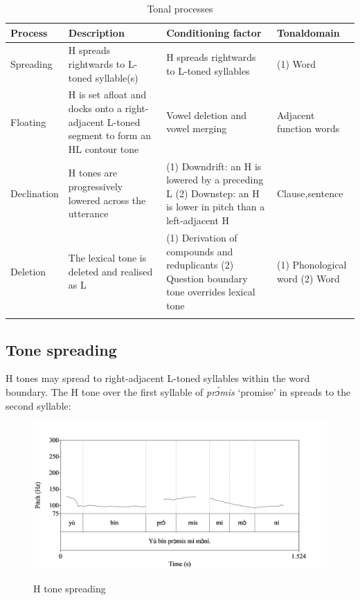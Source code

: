 \begin{table}
\caption{Tonal processes}
\label{tab:key:3.3}
\small
\begin{tabularx}{\textwidth}{lQQp{1.5cm}}
\lsptoprule
Process & Description & Conditioning factor & Tonal\newline  domain\\
\midrule 
Spreading & H spreads rightwards to L-toned syllable(s) & H spreads rightwards to L-toned syllables & (1) Word\\

\tablevspace
Floating & H is set afloat and docks onto a right-adjacent L-toned segment to form an HL contour tone & Vowel deletion and vowel merging & Adjacent function words\\

\tablevspace
Declination & H tones are progressively lowered across the utterance & (1) Downdrift: an H is lowered by a preceding L
\newline 
(2)      Downstep: an H is lower in pitch than a left-adjacent H & Clause,\newline  sentence \\

\tablevspace
Deletion & The lexical tone is deleted and realised as L & (1) Derivation of compounds and reduplicants
\newline
(2)      Question boundary tone overrides lexical tone & (1) Phonological word
\newline 
(2)         Word\\
\lspbottomrule
\end{tabularx}
\end{table}

\subsection{Tone spreading}\label{sec:3.2.1}

H tones may spread to right-adjacent L-toned syllables within the word boundary. The H tone over the first syllable of \textit{prɔ́mis} ‘promise’ in  spreads to the second syllable: 

\begin{figure}
\caption{H tone spreading}
\includegraphics[height=.3\textheight]{figures/yakpomod-img13.png}
\label{fig:key:3.11}
\end{figure}
 



